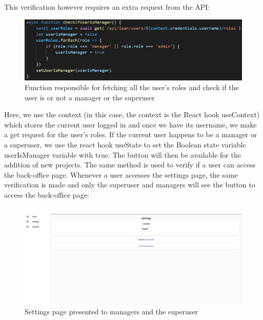 \documentclass[a4paper,twoside,10pt]{report}
\begin{document}
\pagebreak
This verification however requires an extra request from the API: 
\begin{figure}[h!]
\center
  \includegraphics[width=\textwidth]{checkIfUserIsManager.png}
\caption{Function responsible for fetching all the user's roles and check if the user is or not a manager or the superuser}
\end{figure}

\newpage
Here, we use the context (in this case, the context is the React hook useContext) which stores the current user logged in and once we have its username, we make a get request for the user's roles. 
If the current user happens to be a manager or a superuser, we use the react hook useState to set the Boolean state variable userIsManager variable with true. The button will then be available for the addition of new projects.
The same method is used to verify if a user can access the back-office page. Whenever a user accesses the settings page, the same verification is made and only the superuser and managers will see the button to access the back-office page:

\begin{figure}[h!]
\center
  \includegraphics[width=\textwidth]{settingsPage.png}
\caption{Settings page presented to managers and the superuser}
\end{figure}
\end{document}
